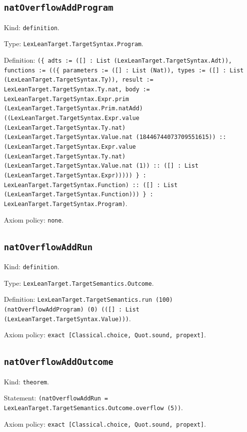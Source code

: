 \documentclass[11pt]{article}
\begin{document}
\subsection*{\texttt{natOverflowAddProgram}}
\noindent Kind: \texttt{definition}.\par
\noindent Type: \texttt{LexLeanTarget.TargetSyntax.Program}.\par
\noindent Definition: \texttt{(\{ adts := ([] : List (LexLeanTarget.TargetSyntax.Adt)), functions := ((\{ parameters := ([] : List (Nat)), types := ([] : List (LexLeanTarget.TargetSyntax.Ty)), result := LexLeanTarget.TargetSyntax.Ty.nat, body := LexLeanTarget.TargetSyntax.Expr.prim (LexLeanTarget.TargetSyntax.Prim.natAdd) ((LexLeanTarget.TargetSyntax.Expr.value (LexLeanTarget.TargetSyntax.Ty.nat) (LexLeanTarget.TargetSyntax.Value.nat (18446744073709551615)) :: (LexLeanTarget.TargetSyntax.Expr.value (LexLeanTarget.TargetSyntax.Ty.nat) (LexLeanTarget.TargetSyntax.Value.nat (1)) :: ([] : List (LexLeanTarget.TargetSyntax.Expr))))) \} : LexLeanTarget.TargetSyntax.Function) :: ([] : List (LexLeanTarget.TargetSyntax.Function))) \} : LexLeanTarget.TargetSyntax.Program)}.\par
\noindent Axiom policy: \texttt{none}.\par
\subsection*{\texttt{natOverflowAddRun}}
\noindent Kind: \texttt{definition}.\par
\noindent Type: \texttt{LexLeanTarget.TargetSemantics.Outcome}.\par
\noindent Definition: \texttt{LexLeanTarget.TargetSemantics.run (100) (natOverflowAddProgram) (0) (([] : List (LexLeanTarget.TargetSyntax.Value)))}.\par
\noindent Axiom policy: \texttt{exact [Classical.choice, Quot.sound, propext]}.\par
\subsection*{\texttt{natOverflowAddOutcome}}
\noindent Kind: \texttt{theorem}.\par
\noindent Statement: \texttt{(natOverflowAddRun = LexLeanTarget.TargetSemantics.Outcome.overflow (5))}.\par
\noindent Axiom policy: \texttt{exact [Classical.choice, Quot.sound, propext]}.\par
\end{document}
